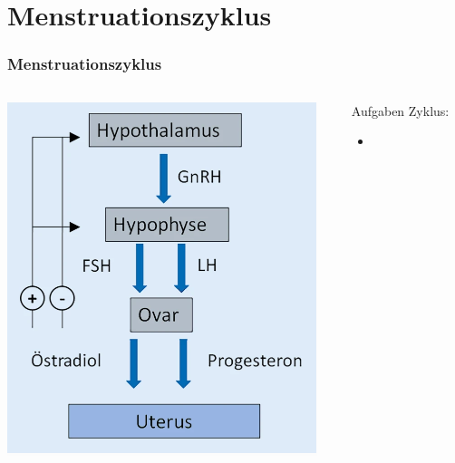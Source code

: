 \documentclass{beamer}
\begin{document}
\section{Menstruationszyklus}

\begin{frame}
\frametitle{Menstruationszyklus}

\begin{columns}[c]

\begin{column}{4cm}

\begin{center}
\includegraphics[width=\textwidth]{hypothalamus_hypophyse_ovar.png}
\end{center}

\end{column}

\begin{column}{7cm}

\pause

\begin{block}{Aufgaben Zyklus:}
\begin{itemize}
\item
 

\end{itemize}
\end{block}
\end{column}
\end{columns}
\end{frame}
\end{document}
